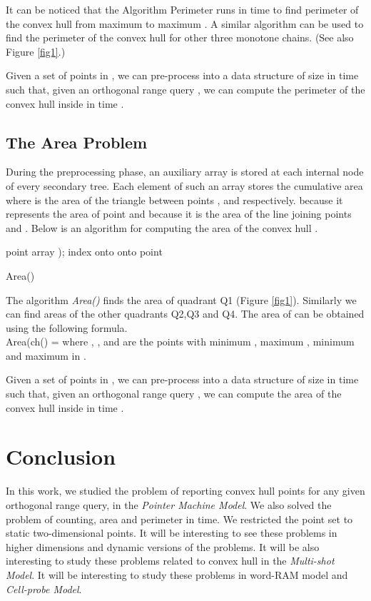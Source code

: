 \documentclass[runningheads,a4paper]{llncs}
\begin{document}
{It can be noticed that the Algorithm Perimeter runs in  time to find perimeter of the convex hull  from
maximum  to maximum . A similar algorithm can be used to find the
perimeter of the convex hull  for other three monotone
chains. (See also Figure \ref{fig1}.)

\begin{theorem}
  Given a set  of  points in , we can pre-process 
  into a data structure of size  in time 
  such that, given an orthogonal range query , we can compute the perimeter of the convex hull inside  in time .
\end{theorem}

\subsection{The Area Problem}
During the preprocessing phase, an auxiliary array  is stored at each
internal node of every secondary tree.  Each element of such an array stores
the cumulative area  where  is the area of the triangle between points
,  and  respectively.   because
it represents the area of point  and  because it is the area
of the line joining points  and . Below is an algorithm for computing the area of the convex hull  .
\begin{algorithm}
  \;
  point 
  array );
  index \;
   onto \;
  \;
  \;
   onto \;
  \;
  \;
  point \;
\caption{Area()}\end{algorithm}
\vspace{-0.6cm}
The  algorithm {\em Area()} finds the area of quadrant Q1 (Figure
\ref{fig1}). Similarly we can find areas of the other quadrants Q2,Q3 and
Q4. The area of  can be obtained using the following formula.\\
Area(ch() =  where , ,  and 
are the points with minimum , maximum , minimum  and maximum  in .
\begin{theorem}
  Given a set  of  points in , we can pre-process 
  into a data structure of size  in time 
  such that, given an orthogonal range query , we can compute the area of the convex hull inside  in time .
\end{theorem}

\section{Conclusion}\label{conclusion}
In this work, we studied the problem of reporting convex hull points for any
given orthogonal range query, in the \emph{Pointer Machine Model}. We also
solved the problem of counting, area and perimeter in  time.
We restricted the point set to static two-dimensional points. It will be
interesting to see these problems in higher dimensions and dynamic versions of
the problems.  It will be also interesting to study these problems related to convex
hull in the \emph{Multi-shot Model}. It will be interesting to study these problems
in {word-RAM} model and \emph{Cell-probe Model}.

}
\end{document}
